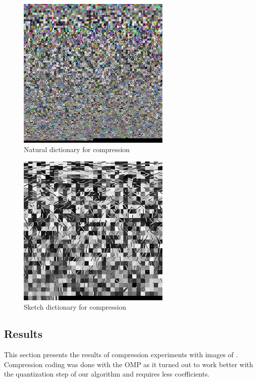 \newpage
\begin{figure}[H]
\centering
\includegraphics[width = 0.66\textwidth]{images/natural_dict.jpg}
\caption{Natural dictionary for compression}\label{fig:naturalDict}
\end{figure}
\begin{figure}[H]
\centering
\includegraphics[width = 0.66\textwidth]{images/sketch_dict.jpg}
\caption{Sketch dictionary for compression}\label{fig:sketchDict}
\end{figure}


\clearpage
\subsection{Results}
This section presents the results of compression experiments with images
of . Compression coding was done with the OMP as it
turned out to work better with the quantization step of our algorithm and
requires less coefficients.

